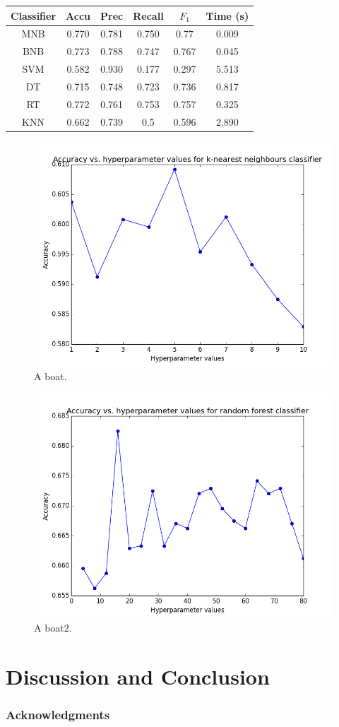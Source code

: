 \documentclass{article} %
\begin{document}
\small
   \centering
   \begin{tabular}{@{}|c|c|c|c|c|c|@{}} %
   \hline

   Classifier & Accu & Prec & Recall & $F_1$ & Time (s) \\ \hline 
      MNB & 0.770 & 0.781 & 0.750 & 0.77 & 0.009 \\
       BNB & 0.773 &  0.788 & 0.747 & 0.767 & 0.045\\
      SVM    &  0.582 & 0.930 & 0.177 & 0.297 & 5.513\\
        DT  &  0.715 & 0.748 & 0.723 & 0.736 & 0.817 \\
      RT &  0.772 & 0.761 & 0.753 & 0.757 & 0.325  \\
      KNN &  0.662 & 0.739 & 0.5 & 0.596 & 2.890 \\
     \hline
   \end{tabular}
   \label{tab:classifiers}

\begin{figure}
\centering
  \includegraphics[width=0.5\linewidth]{hyperparameter_fitting_k_nearest.png}
  \caption{A boat.}
  \label{fig:boat1}
\end{figure}

\begin{figure}
\centering
  \includegraphics[width=0.5\linewidth]{hyperparameter_fitting_random_forest.png}
  \caption{A boat2.}
  \label{fig:boat2}
\end{figure}


\section{Discussion and Conclusion}

\subsubsection*{Acknowledgments}




\end{document}
